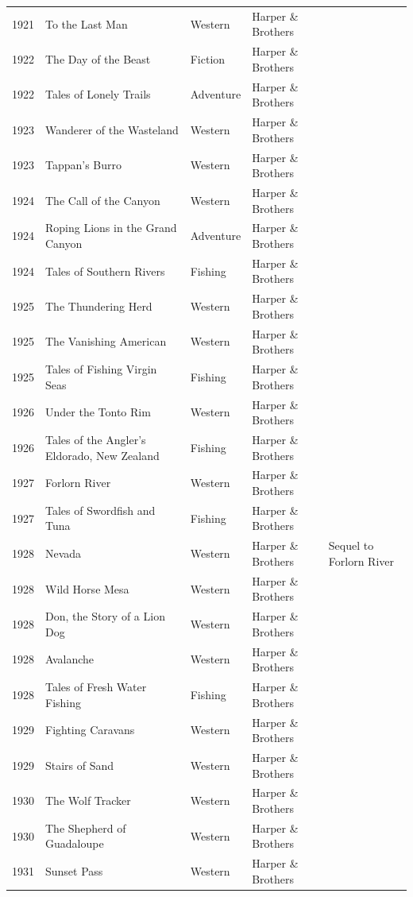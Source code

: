 \documentclass{article}
\begin{document}
\begin{tabular}{lllll}
1921 & To the Last Man & Western & Harper \& Brothers &  \\
1922 & The Day of the Beast & Fiction & Harper \& Brothers &  \\
1922 & Tales of Lonely Trails & Adventure & Harper \& Brothers &  \\
1923 & Wanderer of the Wasteland & Western & Harper \& Brothers &  \\
1923 & Tappan's Burro & Western & Harper \& Brothers &  \\
1924 & The Call of the Canyon & Western & Harper \& Brothers &  \\
1924 & Roping Lions in the Grand Canyon & Adventure & Harper \& Brothers &  \\
1924 & Tales of Southern Rivers & Fishing & Harper \& Brothers &  \\
1925 & The Thundering Herd & Western & Harper \& Brothers &  \\
1925 & The Vanishing American & Western & Harper \& Brothers &  \\
1925 & Tales of Fishing Virgin Seas & Fishing & Harper \& Brothers &  \\
1926 & Under the Tonto Rim & Western & Harper \& Brothers &  \\
1926 & Tales of the Angler's Eldorado, New Zealand & Fishing & Harper \& Brothers &  \\
1927 & Forlorn River & Western & Harper \& Brothers &  \\
1927 & Tales of Swordfish and Tuna & Fishing & Harper \& Brothers &  \\
1928 & Nevada & Western & Harper \& Brothers & Sequel to Forlorn River \\
1928 & Wild Horse Mesa & Western & Harper \& Brothers &  \\
1928 & Don, the Story of a Lion Dog & Western & Harper \& Brothers &  \\
1928 & Avalanche & Western & Harper \& Brothers &  \\
1928 & Tales of Fresh Water Fishing & Fishing & Harper \& Brothers &  \\
1929 & Fighting Caravans & Western & Harper \& Brothers &  \\
1929 & Stairs of Sand & Western & Harper \& Brothers &  \\
1930 & The Wolf Tracker & Western & Harper \& Brothers &  \\
1930 & The Shepherd of Guadaloupe & Western & Harper \& Brothers &  \\
1931 & Sunset Pass & Western & Harper \& Brothers &  \\

\end{tabular}
\end{document}
